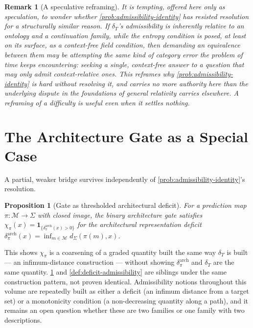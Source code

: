 \documentclass[12pt]{report}
\newtheorem{proposition}[definition]{Proposition}
\newtheorem{remark}[definition]{Remark}
\begin{document}
\begin{remark}[A speculative reframing]
\label{rem:speculative-reframing}
It is tempting, offered here only as speculation, to wonder whether
\cref{prob:admissibility-identity} has resisted resolution for a
structurally similar reason. If $\delta_T$'s admissibility is inherently
relative to an ontology and a continuation family, while the entropy
condition is posed, at least on its surface, as a context-free field
condition, then demanding an equivalence between them may be attempting
the same kind of category error the problem of time keeps encountering:
seeking a single, context-free answer to a question that may only admit
context-relative ones. This reframes why \cref{prob:admissibility-identity}
is hard without resolving it, and carries no more authority here than
the underlying dispute in the foundations of general relativity carries
elsewhere. A reframing of a difficulty is useful even when it settles
nothing.
\end{remark}

\section{The Architecture Gate as a Special Case}
\label{sec:gate-recall}

A partial, weaker bridge survives independently of
\cref{prob:admissibility-identity}'s resolution.

\begin{proposition}[Gate as thresholded architectural deficit]
\label{claim:gate-recall}
For a prediction map $\pi : \mathcal{M} \to \Sigma$ with closed image, the
binary architecture gate satisfies $\chi_\pi(x) =
\mathbf{1}_{\{\delta_\pi^{\mathrm{arch}}(x) > 0\}}$ for the architectural
representation deficit $\delta_\pi^{\mathrm{arch}}(x) = \inf_{m \in
\mathcal{M}} d_\Sigma(\pi(m),x)$.
\end{proposition}

This shows $\chi_\pi$ is a coarsening of a graded quantity built the same
way $\delta_T$ is built --- an infimum-distance construction --- without
showing $\delta_\pi^{\mathrm{arch}}$ and $\delta_T$ are the same
quantity. \cref{claim:gate-recall} and \cref{def:deficit-admissibility}
are siblings under the same construction pattern, not proven identical.
Admissibility notions throughout this volume are repeatedly built as
either a deficit (an infimum distance from a target set) or a
monotonicity condition (a non-decreasing quantity along a path), and it
remains an open question whether these are two families or one family
with two descriptions.
\end{document}
